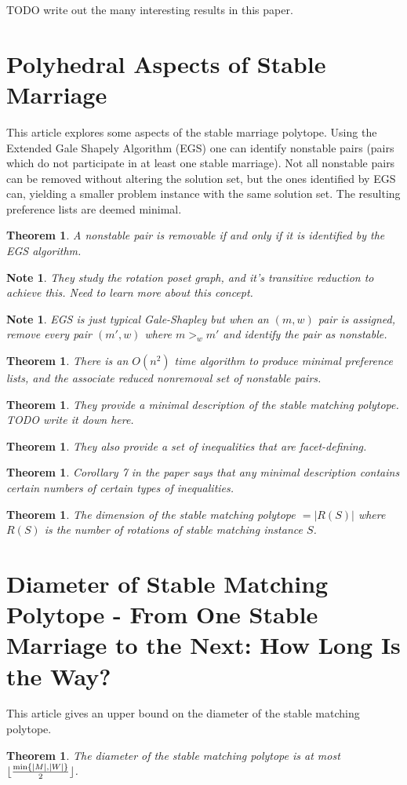 \documentclass{article}
\DeclarePairedDelimiter\floor{\lfloor}{\rfloor}
\newtheorem{theorem}[fact]{Theorem}
\newtheorem{note}[fact]{Note}
\begin{document}
TODO write out the many interesting results in this paper.

\section{Polyhedral Aspects of Stable Marriage}
This article \cite{eirinakis2013polyhedral} explores some aspects of the stable marriage polytope. Using the Extended Gale Shapely Algorithm (EGS) one can identify nonstable pairs (pairs which do not participate in at least one stable marriage). Not all nonstable pairs can be removed without altering the solution set, but the ones identified by EGS can, yielding a smaller problem instance with the same solution set.  The resulting preference lists are deemed minimal.
\begin{theorem}
A nonstable pair is removable if and only if it is identified by the EGS algorithm.
\end{theorem}
\begin{note}
They study the rotation poset graph, and it's transitive reduction to achieve this. Need to learn more about this concept.
\end{note}
\begin{note}
EGS is just typical Gale-Shapley but when an $(m,w)$ pair is assigned, remove every pair $(m',w)$ where $m >_w m'$ and identify the pair as nonstable.
\end{note}
\begin{theorem}
There is an $O(n^2)$ time algorithm to produce minimal preference lists, and the associate reduced nonremoval set of nonstable pairs.
\end{theorem}
\begin{theorem}
They provide a minimal description of the stable matching polytope. TODO write it down here.
\end{theorem}
\begin{theorem}
They also provide a set of inequalities that are facet-defining.
\end{theorem}
\begin{theorem}
Corollary 7 in the paper says that any minimal description contains certain numbers of certain types of inequalities.
\end{theorem}
\begin{theorem}
The dimension of the stable matching polytope $= |R(S)|$ where $R(S)$ is the number of rotations of stable matching instance $S$.
\end{theorem}
\section{Diameter of Stable Matching Polytope - From One Stable Marriage to the Next: How Long Is the Way?}
This article \cite{eirinakis2014one} gives an upper bound on the diameter of the stable matching polytope.
\begin{theorem}
The diameter of the stable matching polytope is at most $\floor{\frac{\min\{|M|,|W|\}}{2}}$.
\end{theorem}


\end{document}
